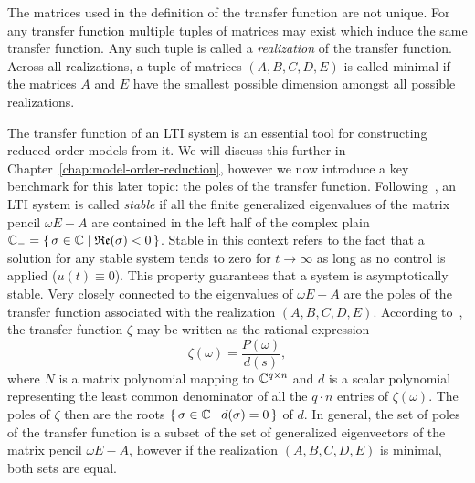 \begin{remark}
    The matrices used in the definition of the transfer function are not unique.
    For any transfer function multiple tuples of matrices may exist which induce the same transfer function.
    Any such tuple is called a \emph{realization} of the transfer function.
    Across all realizations, a tuple of matrices $(A, B, C, D, E)$ is called minimal if the matrices $A$ and $E$ have the smallest possible dimension amongst all possible realizations.
\end{remark}

The transfer function of an LTI system is an essential tool for constructing reduced order models from it.
We will discuss this further in Chapter~\ref{chap:model-order-reduction}, however we now introduce a key benchmark for this later topic: the poles of the transfer function.
Following~\cite{Benner2017}, an LTI system is called \emph{stable} if all the finite generalized eigenvalues of the matrix pencil $\omega E - A$ are contained in the left half of the complex plain $\mathbb{C}_{-} = \left\{\,\sigma \in \mathbb{C}\mid\mathfrak{Re}(\sigma) < 0\,\right\}$.
Stable in this context refers to the fact that a solution for any stable system tends to zero for $t \rightarrow \infty$ as long as no control is applied ($u(t) \equiv 0$).
This property guarantees that a system is asymptotically stable.
Very closely connected to the eigenvalues of $\omega E - A$ are the poles of the transfer function associated with the realization $(A, B, C, D, E)$.
According to~\cite[Section~2]{Benner2017}, the transfer function $\zeta$ may be written as the rational expression
\begin{equation*}
    \zeta(\omega) = \frac{P(\omega)}{d(s)},
\end{equation*}
where $N$ is a matrix polynomial mapping to $\mathbb{C}^{q \times n}$ and $d$ is a scalar polynomial representing the least common denominator of all the $q \cdot n$ entries of $\zeta(\omega)$.
The poles of $\zeta$ then are the roots $\left\{\,\sigma \in \mathbb{C}\mid d(\sigma) = 0\,\right\}$ of $d$.
In general, the set of poles of the transfer function is a subset of the set of generalized eigenvectors of the matrix pencil $\omega E - A$, however if the realization $(A, B, C, D, E)$ is minimal, both sets are equal.
